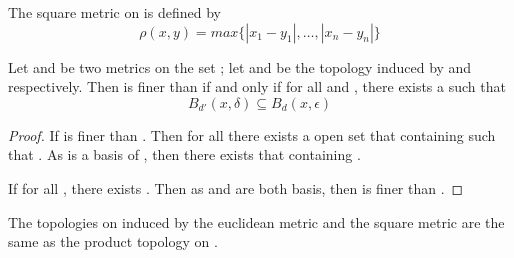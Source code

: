 \begin{definition}\label{def:SquareMetric}
      The square metric \mt{
            \rho
      } on  is defined by
      \begin{equation*}
            \rho(x,y) = max\{
                  |x_{1}-y_{1}|,\dots,|x_{n}-y_{n}|
            \}
      \end{equation*}
\end{definition}

\begin{lemma}
      Let  and  be two metrics on the set ; let  and  be the topology induced by  and  respectively. Then  is finer than  if and only if for all  and , there exists a  such that
      \begin{equation*}
            B_{d'}(x,\delta) \subseteq B_{d}(x,\epsilon)
      \end{equation*}
\end{lemma}

\begin{proof}
      If  is finer than . Then for all  there exists a open set  that containing  such that . As  is a basis of , then there exists  that containing .

      If for all , there exists . Then as  and  are both basis, then  is finer than .
\end{proof}

\begin{theorem}\omitObviuos
      The topologies on  induced by the euclidean metric  and the square metric \mt{\rho} are the same as the product topology on .
\end{theorem}

